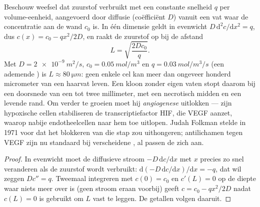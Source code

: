\begin{proposition}\label{prop:b3:cancer-biology:oxygen}
Beschouw weefsel dat zuurstof verbruikt met een constante snelheid $q$
per volume-eenheid, aangevoerd door diffusie (coëfficiënt $D$) vanuit
een vat waar de concentratie aan de wand $c_{0}$ is. In één dimensie
geldt in evenwicht $D\,
\mathrm{d}^{2}c/\mathrm{d}x^{2} = q$, dus $c(x) = c_{0} - qx^{2}/2D$,
en raakt de zuurstof op bij de afstand
\[
L = \sqrt{\frac{2Dc_{0}}{q}} .
\]
Met $D = \qty{2e-9}{m^2/s}$, $c_{0} = \qty{0.05}{mol/m^3}$ en $q =
\qty{0.03}{mol/m^3/s}$ (een ademende ) is $L \approx \qty{80}{\micro
m}$: geen enkele cel kan meer dan ongeveer honderd micrometer van een
haarvat leven. Een kloon zonder eigen vaten stopt daarom bij een
doorsnede van een tot twee millimeter, met een necrotisch midden en een
levende rand. Om verder te groeien moet hij \emph{angiogenese}
uitlokken --- zijn hypoxische cellen stabiliseren de transcriptiefactor
HIF, die VEGF aanzet, waarop nabije endotheelcellen naar hem toe
uitlopen. Judah Folkman stelde in 1971 voor dat het blokkeren van die
stap  zou uithongeren; antilichamen tegen VEGF zijn nu standaard
bij verscheidene , al passen de  zich aan.
\end{proposition}
\begin{proof}
In evenwicht moet de diffusieve stroom $-D\,\mathrm{d}c/\mathrm{d}x$
met $x$ precies zo snel veranderen als de zuurstof wordt verbruikt:
$\mathrm{d}(-D\,
\mathrm{d}c/\mathrm{d}x)/\mathrm{d}x = -q$, dat wil zeggen $D c'' = q$.
Tweemaal integreren met $c(0) = c_{0}$ en $c'(L) = 0$ op de diepte waar
niets meer over is (geen stroom eraan voorbij) geeft
$c = c_{0} - qx^{2}/2D$ nadat $c(L) = 0$ is gebruikt om $L$ vast te
leggen. De getallen volgen daaruit.
\end{proof}

